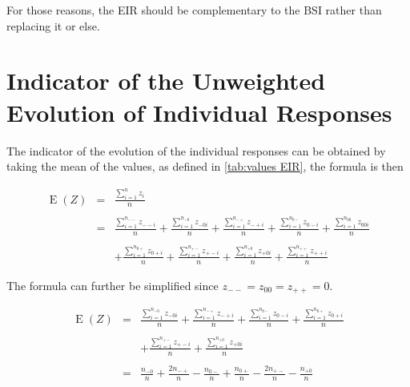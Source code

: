\documentclass[12pt,a4paper,oneside]{book}
\DeclareMathOperator{\E}{E}
\begin{document}
For those reasons, the EIR should be complementary to the BSI rather than replacing it or else.



\section{Indicator of the Unweighted Evolution of Individual Responses}


The indicator of the evolution of the individual responses can be obtained by taking the mean of the values, as defined in \autoref{tab:values EIR}, the formula is then

\begin{eqnarray}
    \E(Z) &=&  \frac{ \sum_{i=1}^n z_i}{n} \\ \nonumber \\
        &=&  \frac{ \sum_{i=1}^{n_{--}} z_{--i}}{n} 
     +  \frac{\sum_{i=1}^{n_{-0}} z_{-0i} }{n} 
    +  \frac{\sum_{i=1}^{n_{-+}} z_{-+i}}{n} 
    +  \frac{\sum_{i=1}^{n_{0-}} z_{0-i} }{n} 
    +  \frac{\sum_{i=1}^{n_{00}} z_{00i} }{n}  \nonumber \\ \nonumber \\
    &&  +  \frac{\sum_{i=1}^{n_{0+}} z_{0+i}}{n} 
    +  \frac{\sum_{i=1}^{n_{+-}} z_{+-i} }{n} 
    +  \frac{\sum_{i=1}^{n_{+0}} z_{+0i} }{n} 
    +  \frac{\sum_{i=1}^{n_{++}} z_{++i}}{n} 
\end{eqnarray}

The formula can further be simplified since $z_{--} = z_{00} = z_{++} = 0$.

\begin{eqnarray}
    \E(Z) &=&  
      \frac{\sum_{i=1}^{n_{-0}} z_{-0i} }{n} 
    +  \frac{\sum_{i=1}^{n_{-+}} z_{-+i}}{n} 
    +  \frac{\sum_{i=1}^{n_{0-}} z_{0-i} }{n} 
    +  \frac{\sum_{i=1}^{n_{0+}} z_{0+i}}{n}  \nonumber \\ \nonumber \\
&&  +  \frac{\sum_{i=1}^{n_{+-}} z_{+-i} }{n} 
    +  \frac{\sum_{i=1}^{n_{+0}} z_{+0i} }{n}  \\ \nonumber \\
    &=&  
         \frac{n_{-0}}{n} 
    +   \frac{2n_{-+}}{n} 
    -    \frac{n_{0-}}{n} 
    +    \frac{n_{0+}}{n}  
    -   \frac{2n_{+-}}{n} 
    -    \frac{n_{+0}}{n} 
\end{eqnarray}
\end{document}
